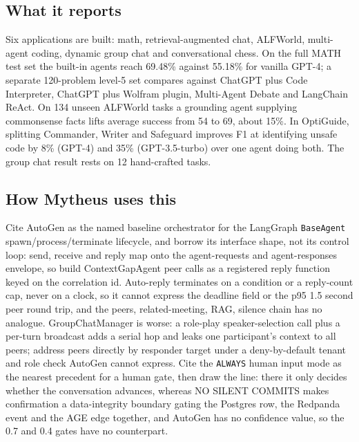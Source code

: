 \subsection{What it reports}

Six applications are built: math, retrieval-augmented chat, ALFWorld, multi-agent coding, dynamic group chat and conversational chess. On the full MATH test set the built-in agents reach 69.48\% against 55.18\% for vanilla GPT-4; a separate 120-problem level-5 set compares against ChatGPT plus Code Interpreter, ChatGPT plus Wolfram plugin, Multi-Agent Debate and LangChain ReAct. On 134 unseen ALFWorld tasks a grounding agent supplying commonsense facts lifts average success from 54 to 69, about 15\%. In OptiGuide, splitting Commander, Writer and Safeguard improves F1 at identifying unsafe code by 8\% (GPT-4) and 35\% (GPT-3.5-turbo) over one agent doing both. The group chat result rests on 12 hand-crafted tasks.

\subsection{How Mytheus uses this}
\begin{takeaway}
Cite AutoGen as the named baseline orchestrator for the LangGraph \texttt{BaseAgent} spawn/process/terminate lifecycle, and borrow its interface shape, not its control loop: send, receive and reply map onto the agent-requests and agent-responses envelope, so build ContextGapAgent peer calls as a registered reply function keyed on the correlation id. Auto-reply terminates on a condition or a reply-count cap, never on a clock, so it cannot express the deadline field or the p95 1.5 second peer round trip, and the peers, related-meeting, RAG, silence chain has no analogue. GroupChatManager is worse: a role-play speaker-selection call plus a per-turn broadcast adds a serial hop and leaks one participant's context to all peers; address peers directly by responder target under a deny-by-default tenant and role check AutoGen cannot express. Cite the \texttt{ALWAYS} human input mode as the nearest precedent for a human gate, then draw the line: there it only decides whether the conversation advances, whereas NO SILENT COMMITS makes confirmation a data-integrity boundary gating the Postgres row, the Redpanda event and the AGE edge together, and AutoGen has no confidence value, so the 0.7 and 0.4 gates have no counterpart.
\end{takeaway}

